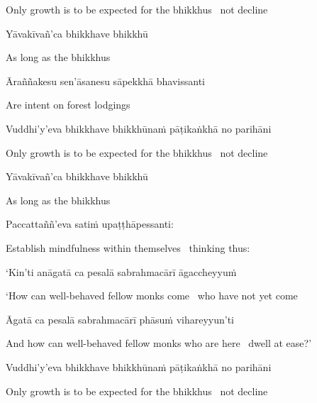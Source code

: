 \begin{english}
  Only growth is to be expected for the bhikkhus \breathmark\ not decline
\end{english}

Yāvakīvañ'ca bhikkhave bhikkhū

\begin{english}
  As long as the bhikkhus
\end{english}

Āraññakesu sen'āsanesu sāpekkhā bhavissanti

\begin{english}
  Are intent on forest lodgings
\end{english}

Vuddhi'y'eva bhikkhave bhikkhūnaṁ pāṭikaṅkhā no parihāni

\begin{english}
  Only growth is to be expected for the bhikkhus \breathmark\ not decline
\end{english}

Yāvakīvañ'ca bhikkhave bhikkhū

\begin{english}
  As long as the bhikkhus
\end{english}

\ifninebythirteenversion\clearpage\fi

Paccattaññ'eva satiṁ upaṭṭhāpessanti:

\begin{english}
  Establish mindfulness within themselves \breathmark\ thinking thus:
\end{english}

`Kin'ti anāgatā ca pesalā sabrahmacārī āgaccheyyuṁ

\begin{english}
  `How can well-behaved fellow monks come \breathmark\ who have not yet come
\end{english}

Āgatā ca pesalā sabrahmacārī phāsuṁ vihareyyun'ti

\begin{english-hang}
  And how can well-behaved fellow monks who are here \breathmark\ dwell at ease?'
\end{english-hang}

Vuddhi'y'eva bhikkhave bhikkhūnaṁ pāṭikaṅkhā no parihāni

\begin{english}
  Only growth is to be expected for the bhikkhus \breathmark\ not decline
\end{english}

